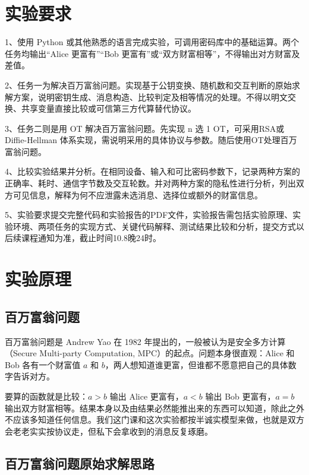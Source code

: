 \documentclass{SYSUReport}
\date{2026 年 9 月 10 日}
\begin{document}
\cover
\thispagestyle{empty} %
\clearpage
\tableofcontents
\clearpage
{}
\setcounter{page}{1}
\section{实验要求}
1、使用 Python 或其他熟悉的语言完成实验，可调用密码库中的基础运算。两个任务均输出“Alice 更富有”“Bob 更富有”或“双方财富相等”，不得输出对方财富及差值。

2、任务一为解决百万富翁问题。实现基于公钥变换、随机数和交互判断的原始求解方案，说明密钥生成、消息构造、比较判定及相等情况的处理。不得以明文交换、共享变量直接比较或可信第三方代算替代协议。

3、任务二则是用 OT 解决百万富翁问题。先实现 n 选 1 OT，可采用RSA或 Diffie-Hellman 体系实现，需说明采用的具体协议与参数。随后使用OT处理百万富翁问题。

4、比较实验结果并分析。在相同设备、输入和可比密码参数下，记录两种方案的正确率、耗时、通信字节数及交互轮数。并对两种方案的隐私性进行分析，列出双方可见信息，解释为何不应泄露未选消息、选择位或额外的财富信息。

5、实验要求提交完整代码和实验报告的PDF文件，实验报告需包括实验原理、实验环境、两项任务的实现方式、关键代码解释、测试结果比较和分析，提交方式以后续课程通知为准，截止时间10.8晚24时。

\section{实验原理}
\subsection{百万富翁问题}

百万富翁问题是 Andrew Yao 在 1982 年提出的，一般被认为是安全多方计算（Secure Multi-party Computation, MPC）的起点。问题本身很直观：Alice 和 Bob 各有一个财富值 \(a\) 和 \(b\)，两人想知道谁更富，但谁都不愿意把自己的具体数字告诉对方。

要算的函数就是比较：\(a > b\) 输出 Alice 更富有，\(a < b\) 输出 Bob 更富有，\(a = b\) 输出双方财富相等。结果本身以及由结果必然能推出来的东西可以知道，除此之外不应该多知道任何信息。我们这门课和这次实验都按半诚实模型来做，也就是双方会老老实实按协议走，但私下会拿收到的消息反复琢磨。

\subsection{百万富翁问题原始求解思路}
\end{document}
